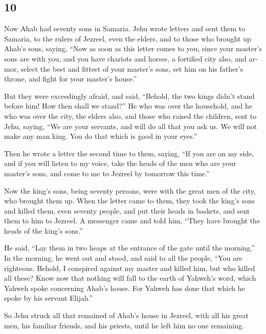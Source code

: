 \begin{paracol}{2}
\switchcolumn
\begin{otherlanguage}{english}

\hypertarget{section-19}{%
\section{10}\label{section-19}}

 Now Ahab had seventy sons in Samaria. Jehu wrote letters
and sent them to Samaria, to the rulers of Jezreel, even the elders, and
to those who brought up Ahab's sons, saying,  ``Now as
soon as this letter comes to you, since your master's sons are with you,
and you have chariots and horses, a fortified city also, and armor,
 select the best and fittest of your master's sons, set
him on his father's throne, and fight for your master's house.''

 But they were exceedingly afraid, and said, ``Behold, the
two kings didn't stand before him! How then shall we stand?''
 He who was over the household, and he who was over the
city, the elders also, and those who raised the children, sent to Jehu,
saying, ``We are your servants, and will do all that you ask us. We will
not make any man king. You do that which is good in your eyes.''

 Then he wrote a letter the second time to them, saying,
``If you are on my side, and if you will listen to my voice, take the
heads of the men who are your master's sons, and come to me to Jezreel
by tomorrow this time.''

Now the king's sons, being seventy persons, were with the great men of
the city, who brought them up.  When the letter came to
them, they took the king's sons and killed them, even seventy people,
and put their heads in baskets, and sent them to him to Jezreel.
 A messenger came and told him, ``They have brought the
heads of the king's sons.''

He said, ``Lay them in two heaps at the entrance of the gate until the
morning.''  In the morning, he went out and stood, and
said to all the people, ``You are righteous. Behold, I conspired against
my master and killed him, but who killed all these?  Know
now that nothing will fall to the earth of Yahweh's word, which Yahweh
spoke concerning Ahab's house. For Yahweh has done that which he spoke
by his servant Elijah.''

 So Jehu struck all that remained of Ahab's house in
Jezreel, with all his great men, his familiar friends, and his priests,
until he left him no one remaining.


\end{otherlanguage}
\end{paracol}
